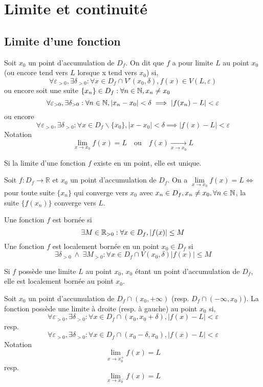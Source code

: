 \section{Limite et continuité}
	\subsection{Limite d'une fonction}
		\begin{mydef}
			Soit $x_0$ un point d'accumulation de $D_f$. On dit que $f$ a pour limite $L$ au point $x_0$ (ou encore tend vers $L$ lorsque x tend vers $x_0$) si,\[\forall\varepsilon_{>0},\exists\delta_{>0} : \forall x\in D_f\cap V'(x_0,\delta), f(x)\in V(L,\varepsilon)\]
			ou encore soit une suite $\{x_n\}\in D_f : \forall n\in\mathbb{N}, x_n\neq x_0$
			\[\forall\varepsilon_{>0},\exists\delta_{>0} : \forall n\in\mathbb{N},|x_n-x_0|<\delta\implies|f(x_n)-L|<\varepsilon \]
			ou encore 
			\[\forall\varepsilon_{>0},\exists\delta_{>0} : \forall x\in D_f\backslash\{x_0\}, |x-x_0|<\delta \implies |f(x)-L|<\varepsilon\]
			Notation
			\[
			\lim_{x\to x_0}f(x)=L\quad\text{ou}\quad f(x)\xrightarrow[x\to x_0]{~} L\]
		\end{mydef}
		\begin{mythm}
			Si la limite d'une fonction $f$ existe en un point, elle est unique.
		\end{mythm}
		\begin{mythm}
			Soit $f:D_f\longrightarrow\mathbb{R}$ et $x_0$ un point d'accumulation de $D_f$. On a $\lim\limits_{x\to x_0}f(x)=L \Longleftrightarrow$ pour toute suite $\{x_n\}$ qui converge vers $x_0$ avec $x_n\in D_f,x_n\neq x_0, \forall n\in\mathbb{N}$, la suite $\{f(x_n)\}$ converge vers $L$. 
		\end{mythm}
		\begin{mydef}
			Une fonction $f$ est bornée si\[\exists M\in\mathbb{R}_{>0} :\forall x\in D_f, |f(x)|\leq M \]
			Une fonction $f$ est localement bornée en un point $x_0\in D_f$ si \[\exists\delta_{>0}~\wedge~\exists M_{>0} :\forall x\in D_f\cap V(x_0,\delta) |f(x)|\leq M\]
		\end{mydef}
		\begin{mythm}
			Si $f$ possède une limite $L$ au point $x_0$, $x_0$ étant un point d'accumulation de $D_f$, elle est localement bornée au point $x_0$.
		\end{mythm}
		\begin{mythm}
			Soit $x_0$ un point d'accumulation de $D_f\cap (x_0,+\infty)$ (resp. $D_f\cap (-\infty,x_0)$). La fonction possède une limite à droite (resp. à gauche) au point $x_0$ si, \[\forall\varepsilon_{>0},\exists\delta_{>0} : \forall x\in D_f\cap (x_0,x_0+\delta), |f(x)-L|<\varepsilon\]
			resp. \[\forall\varepsilon_{>0},\exists\delta_{>0} : \forall x\in D_f\cap (x_0-\delta,x_0), |f(x)-L|<\varepsilon\]
			Notation
			\[\lim_{x\to x_0^+}f(x)=L\]
			resp.
			\[\lim_{x\to x_0^-}f(x)=L\]
		\end{mythm}
